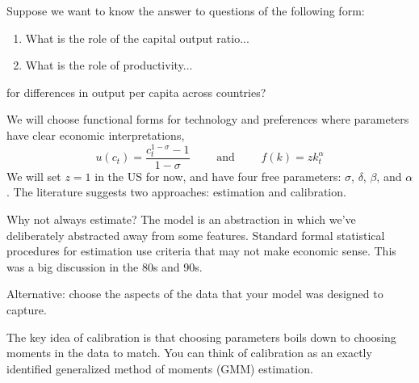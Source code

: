 \documentclass[10pt]{article}
\begin{document}
\begin{example}
	Suppose we want to know the answer to questions of the following form:
	\begin{enumerate}
		\item What is the role of the capital output ratio...
		\item What is the role of productivity...
	\end{enumerate}
	{\raggedleft for differences in output per capita across countries?\par}
	We will choose functional forms for technology and preferences where parameters have clear economic interpretations, \ie
	\[
	u(c_t) = \frac{c_t^{1-\sigma}-1}{1-\sigma} \qquad \text{ and } \qquad f(k) = zk_t^\alpha
	\]
	We will set $z = 1$ in the US for now, and have four free parameters: $\sigma$, $\delta$, $\beta$, and $\alpha$. The literature suggests two approaches: estimation and calibration.
	\begin{question}
		Why not always estimate? The model is an abstraction in which we've deliberately abstracted away from some features. Standard formal statistical procedures for estimation use criteria that may not make economic sense. This was a big discussion in the 80s and 90s.
	\end{question}
	Alternative: choose the aspects of the data that your model was designed to capture.
	
	The key idea of calibration is that choosing parameters boils down to choosing moments in the data to match. You can think of calibration as an exactly identified generalized method of moments (GMM) estimation.
	

\end{example}
\end{document}
